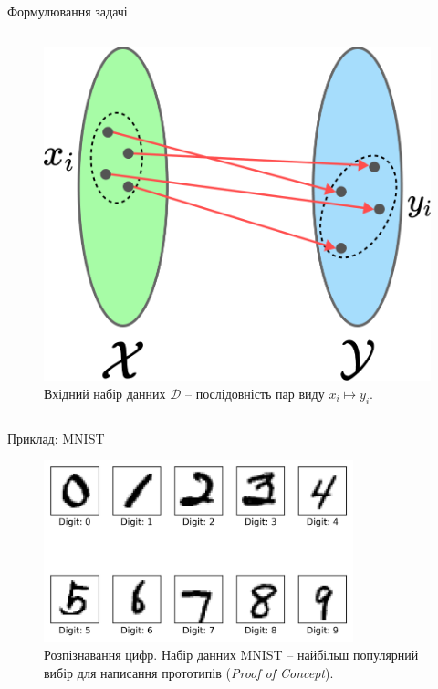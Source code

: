 \documentclass[xcolor={usenames,dvipsnames}]{beamer}
\begin{document}
\begin{frame}{Формулювання задачі}
\begin{columns}
            \begin{column}{0.4\textwidth}
                \begin{figure}
                \centering
                \includegraphics[width=1\textwidth]{images/mapping.png}
                \caption{Вхідний набір данних $\mathcal{D}$ -- послідовність пар виду $x_i \mapsto y_i$.}
                \end{figure}
            \end{column}
        \end{columns}
	\end{frame}

    \begin{frame}{Приклад: MNIST}	
        \begin{figure}
            \centering
            \includegraphics[width=0.8\textwidth]{images/mnist.png}
            \caption{Розпізнавання цифр. Набір данних MNIST -- найбільш популярний вибір для написання прототипів (\textit{Proof of Concept}).}
        \end{figure}
    \end{frame}
\end{document}
